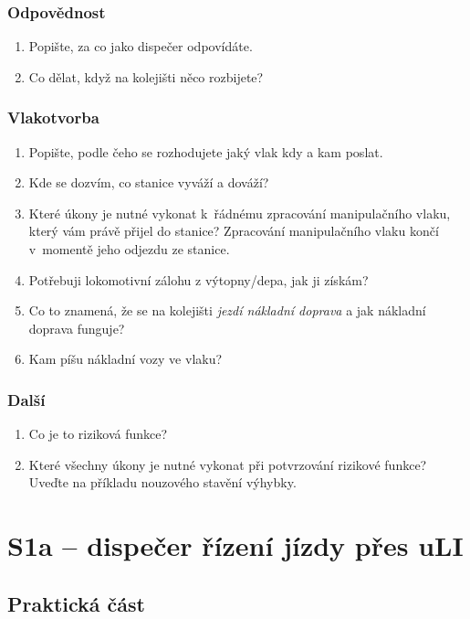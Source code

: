 \documentclass[12pt,a4paper]{article}
\begin{document}
\subsubsection*{Odpovědnost}
\begin{enumerate}[leftmargin=*]
\item Popište, za co jako dispečer odpovídáte.
\item Co dělat, když na kolejišti něco rozbijete?
\end{enumerate}

\subsubsection*{Vlakotvorba}
\begin{enumerate}[leftmargin=*]
\item Popište, podle čeho se rozhodujete jaký vlak kdy a kam poslat.
\item Kde se dozvím, co stanice vyváží a dováží?
\item Které úkony je nutné vykonat k~řádnému zpracování manipulačního vlaku,
který vám právě přijel do stanice? Zpracování manipulačního vlaku končí
v~momentě jeho odjezdu ze stanice.
\item Potřebuji lokomotivní zálohu z výtopny/depa, jak ji získám?
\item Co to znamená, že se na kolejišti \textit{jezdí nákladní doprava} a jak
nákladní doprava funguje?
\item Kam píšu nákladní vozy ve vlaku?
\end{enumerate}

\subsubsection*{Další}
\begin{enumerate}[leftmargin=*]
\item Co je to riziková funkce?
\item Které všechny úkony je nutné vykonat při potvrzování rizikové funkce?
Uveďte na příkladu nouzového stavění výhybky.
\end{enumerate}


\newpage
\section{S1a – dispečer řízení jízdy přes uLI}

\subsection*{Praktická část}
\end{document}
